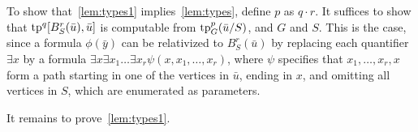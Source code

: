 To show that~\cref{lem:types1} implies~\cref{lem:types}, define $p$ as $q\cdot r$. It suffices to show that
$\mathrm{tp}^{q}[B^r_S(\bar u), \bar u]$ is computable from $\mathrm{tp}_G^p(\bar u/S)$, and $G$ and $S$. This is the case, since
a formula $\phi(\bar y)$
can be relativized to $B^r_S(\bar u)$
by replacing each quantifier $\exists x$ by a formula
$\exists x\exists x_1\ldots\exists x_r\psi (x,x_1,\ldots,x_r)$,
where $\psi$ specifies that $x_1,\ldots,x_r,x$ form a path
starting in one of the vertices in $\bar u$, ending in $x$,
and omitting all vertices in $S$, which are enumerated as parameters.

It remains to prove~\cref{lem:types1}.




